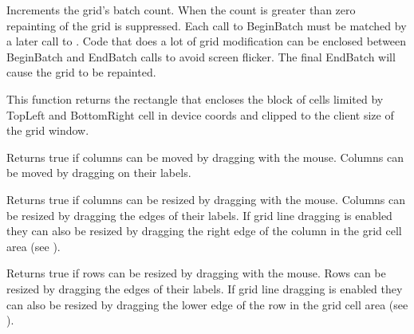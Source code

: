Increments the grid's batch count. When the count is greater than zero repainting of
the grid is suppressed. Each call to BeginBatch must be matched by a later call to
. Code that does a lot of grid
modification can be enclosed between BeginBatch and EndBatch calls to avoid
screen flicker. The final EndBatch will cause the grid to be repainted.



\label{wxgridblocktodevicerect}


This function returns the rectangle that encloses the block of cells
limited by TopLeft and BottomRight cell in device coords and clipped
to the client size of the grid window.



\label{wxgridcandragcolmove}


Returns true if columns can be moved by dragging with the mouse. Columns can be moved
by dragging on their labels.



\label{wxgridcandragcolsize}


Returns true if columns can be resized by dragging with the mouse. Columns can be resized
by dragging the edges of their labels. If grid line dragging is enabled they can also be
resized by dragging the right edge of the column in the grid cell area
(see ).



\label{wxgridcandragrowsize}


Returns true if rows can be resized by dragging with the mouse. Rows can be resized
by dragging the edges of their labels. If grid line dragging is enabled they can also be
resized by dragging the lower edge of the row in the grid cell area
(see ).



\label{wxgridcandraggridsize}


